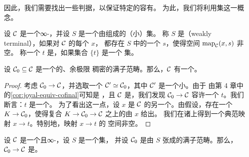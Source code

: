因此，我们需要找出一些判据，以保证特定的\trCategories{}容有\trTerminalObject{}。
为此，我们将利用\trWeaklyTerminal{}集这一概念。

\begin{definition}\label{def:weakly-terminal}
设 $\mathcal{C}$ 是一个∞-\trCategory{}，并设 $S$ 是一个由\trObject{}组成的（小）集。
称 $S$ 是\emph{\trWeaklyTerminal{}}（weakly terminal），如果对 $\mathcal{C}$ 的每个\trObject{} $x$，
都存在 $S$ 中的一个\trObject{} $s$，使得空间 $\mathrm{map}_{\mathcal{C}}(x, s)$ 非空。
称一个\trObject{} $t$ 是\trWeaklyTerminal{}，如果集合 $\{t\}$ 是一个%
\trWeaklyTerminal{}集。
\end{definition}

\begin{lemma}\label{lem:colimit-dense-weakly-terminal}
设 $\mathcal{C}_0 \subseteq \mathcal{C}$ 是一个\trCocomplete{}\trCategory{}的\trEssentiallySmall{}、余极限
稠密的满子范畴。那么，$\mathcal{C}$ 有一个\trWeaklyTerminal{}\trObject{}。
\end{lemma}

\begin{proof}
考虑\trFunctor{} $\mathcal{C}_0 \to \mathcal{C}$，并选取一个\trJoyalEquivalence{}%
$\mathcal{C}' \simeq \mathcal{C}_0$，其中 $\mathcal{C}'$ 是一个小\trSimplicialSet{}。由于%
\trJoyalEquivalence{}由第 4 章中的\cref{cor:joyal-equiv-cofinal}可知是%
\trCofinal{}，且 $\mathcal{C}$ 是\trCocomplete{}，我们发现\trFunctor{}%
$\mathcal{C}_0 \to \mathcal{C}$ 容许一个\trColimit{} $t$。我们断言：$t$ 是一个\trWeaklyTerminal{}\trObject{}。
为了看出这一点，设 $x$ 是 $\mathcal{C}$ 的另一个\trObject{}。由假设，存在一个\trFunctor{}%
$K \to \mathcal{C}_0$，使得复合 $K \to \mathcal{C}_0 \to \mathcal{C}$ 之上的\trColimit{}由 $x$ 给出。
我们在诸\trColimit{}上得到一个典范映射 $x \to t$。特别地，映射 $x \to t$ 的
空间非空。
\end{proof}

\begin{proposition}\label{prop:weakly-terminal-cofinal}
设 $\mathcal{C}$ 是一个\trLocallySmall{}且\trCocomplete{}∞-\trCategory{}，设 $S$ 是一个\trWeaklyTerminal{}集，
并设 $\mathcal{C}_0$ 是由 $S$ 张成的满子范畴。那么，$\mathcal{C}_0 \to \mathcal{C}$ 是\trCofinal{}。
\end{proposition}

